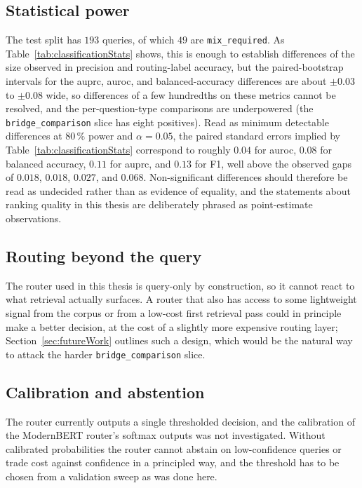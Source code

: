 \documentclass[english, bibtex]{kththesis}               %
\numberwithin{listing}{chapter}
\begin{document}
\subsection{Statistical power}
\label{sec:limitStatisticalPower}

The test split has $193$ queries, of which $49$ are \texttt{mix\_required}. As Table~\ref{tab:classificationStats} shows, this is enough to establish differences of the size observed in precision and routing-label accuracy, but the paired-bootstrap intervals for the \gls{auprc}, \gls{auroc}, and balanced-accuracy differences are about $\pm 0.03$ to $\pm 0.08$ wide, so differences of a few hundredths on these metrics cannot be resolved, and the per-question-type comparisons are underpowered (the \texttt{bridge\_comparison} slice has eight positives). Read as minimum detectable differences at $80\,\%$ power and $\alpha = 0.05$, the paired standard errors implied by Table~\ref{tab:classificationStats} correspond to roughly $0.04$ for \gls{auroc}, $0.08$ for balanced accuracy, $0.11$ for \gls{auprc}, and $0.13$ for F1, well above the observed gaps of $0.018$, $0.018$, $0.027$, and $0.068$. Non-significant differences should therefore be read as undecided rather than as evidence of equality, and the statements about ranking quality in this thesis are deliberately phrased as point-estimate observations.

\subsection{Routing beyond the query}
\label{sec:limitRouting}

The router used in this thesis is query-only by construction, so it cannot react to what retrieval actually surfaces. A router that also has access to some lightweight signal from the corpus or from a low-cost first retrieval pass could in principle make a better decision, at the cost of a slightly more expensive routing layer; Section~\ref{sec:futureWork} outlines such a design, which would be the natural way to attack the harder \texttt{bridge\_comparison} slice.

\subsection{Calibration and abstention}
\label{sec:limitCalibration}

The router currently outputs a single thresholded decision, and the calibration of the ModernBERT router's softmax outputs was not investigated. Without calibrated probabilities the router cannot abstain on low-confidence queries or trade cost against confidence in a principled way, and the threshold has to be chosen from a validation sweep as was done here.
\end{document}

